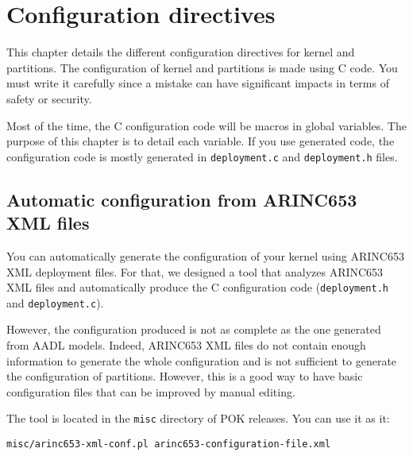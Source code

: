 %
%
%
%
%

\chapter{Configuration directives}

This chapter details the different configuration directives for kernel and
partitions. The configuration of kernel and partitions is made using C code. You
must write it carefully since a mistake can have significant impacts in terms of
safety or security.

Most of the time, the C configuration code will be macros in global variables.
The purpose of this chapter is to detail each variable. If you use generated
code, the configuration code is mostly generated in \texttt{deployment.c} and
\texttt{deployment.h} files.

\section{Automatic configuration from ARINC653 XML files}
\label{section-arinc653-xml-configuration}
You can automatically generate the configuration of your kernel using ARINC653
XML deployment files. For that, we designed a tool that analyzes ARINC653 XML
files and automatically produce the C configuration code (\texttt{deployment.h}
and \texttt{deployment.c}).

However, the configuration produced is not as complete as the one generated from
AADL models. Indeed, ARINC653 XML files do not contain enough information to
generate the whole configuration and is not sufficient to generate the
configuration of partitions. However, this is a good way to have basic
configuration files that can be improved by manual editing.

The tool is located in the \texttt{misc} directory of POK releases. You can use
it as it:
\begin{verbatim}
misc/arinc653-xml-conf.pl arinc653-configuration-file.xml
\end{verbatim}

